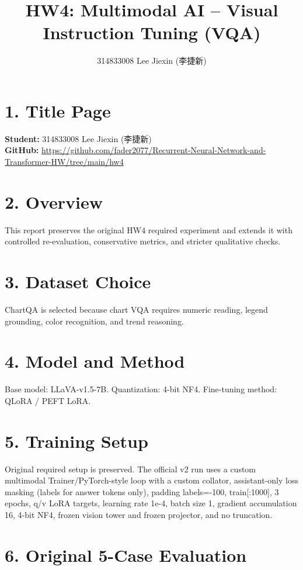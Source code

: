 \documentclass[11pt]{article}
\title{HW4: Multimodal AI -- Visual Instruction Tuning (VQA)}
\author{314833008 Lee Jiexin (李捷新)}
\date{}
\begin{document}
\maketitle

\section*{1. Title Page}
\textbf{Student:} 314833008 Lee Jiexin (李捷新)\\
\textbf{GitHub:} \url{https://github.com/fader2077/Recurrent-Neural-Network-and-Transformer-HW/tree/main/hw4}

\section*{2. Overview}
This report preserves the original HW4 required experiment and extends it with controlled re-evaluation, conservative metrics, and stricter qualitative checks.

\section*{3. Dataset Choice}
ChartQA is selected because chart VQA requires numeric reading, legend grounding, color recognition, and trend reasoning.

\section*{4. Model and Method}
Base model: LLaVA-v1.5-7B. Quantization: 4-bit NF4. Fine-tuning method: QLoRA / PEFT LoRA.

\section*{5. Training Setup}
Original required setup is preserved. The official v2 run uses a custom multimodal Trainer/PyTorch-style loop with a custom collator, assistant-only loss masking (labels for answer tokens only), padding labels=-100, train[:1000], 3 epochs, q/v LoRA targets, learning rate 1e-4, batch size 1, gradient accumulation 16, 4-bit NF4, frozen vision tower and frozen projector, and no truncation.

\section*{6. Original 5-Case Evaluation}
\end{document}
